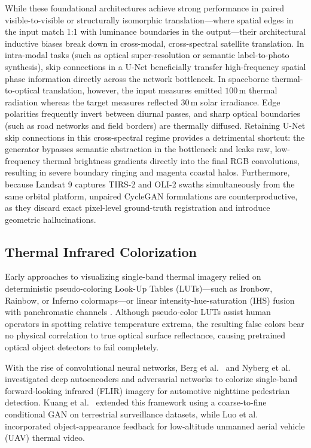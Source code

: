\documentclass[10pt,a4paper,twoside]{article}
\begin{document}
While these foundational architectures achieve strong performance in paired visible-to-visible or structurally isomorphic translation---where spatial edges in the input match 1:1 with luminance boundaries in the output---their architectural inductive biases break down in cross-modal, cross-spectral satellite translation. In intra-modal tasks (such as optical super-resolution or semantic label-to-photo synthesis), skip connections in a U-Net \cite{ref6, ref9} beneficially transfer high-frequency spatial phase information directly across the network bottleneck. In spaceborne thermal-to-optical translation, however, the input measures emitted $100\,\text{m}$ thermal radiation whereas the target measures reflected $30\,\text{m}$ solar irradiance. Edge polarities frequently invert between diurnal passes, and sharp optical boundaries (such as road networks and field borders) are thermally diffused. Retaining U-Net skip connections in this cross-spectral regime provides a detrimental shortcut: the generator bypasses semantic abstraction in the bottleneck and leaks raw, low-frequency thermal brightness gradients directly into the final RGB convolutions, resulting in severe boundary ringing and magenta coastal halos. Furthermore, because Landsat 9 captures TIRS-2 and OLI-2 swaths simultaneously from the same orbital platform, unpaired CycleGAN formulations are counterproductive, as they discard exact pixel-level ground-truth registration and introduce geometric hallucinations.

\subsection{Thermal Infrared Colorization}
Early approaches to visualizing single-band thermal imagery relied on deterministic pseudo-coloring Look-Up Tables (LUTs)---such as Ironbow, Rainbow, or Inferno colormaps---or linear intensity-hue-saturation (IHS) fusion with panchromatic channels \cite{ref1}. Although pseudo-color LUTs assist human operators in spotting relative temperature extrema, the resulting false colors bear no physical correlation to true optical surface reflectance, causing pretrained optical object detectors to fail completely.

With the rise of convolutional neural networks, Berg et al.~\cite{ref15} and Nyberg et al.~\cite{ref16} investigated deep autoencoders and adversarial networks to colorize single-band forward-looking infrared (FLIR) imagery for automotive nighttime pedestrian detection. Kuang et al.~\cite{ref17} extended this framework using a coarse-to-fine conditional GAN on terrestrial surveillance datasets, while Luo et al.~\cite{ref18} incorporated object-appearance feedback for low-altitude unmanned aerial vehicle (UAV) thermal video.
\end{document}
